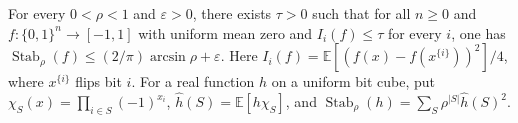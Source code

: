 \begin{theorem}
For every $0<\rho<1$ and $\varepsilon>0$, there exists $\tau>0$ such that for all $n\ge0$ and $f\colon\{0,1\}^n\to[-1,1]$ with uniform mean zero and $I_i(f)\le\tau$ for every $i$, one has $\operatorname{Stab}_\rho(f)\le(2/\pi)\arcsin\rho+\varepsilon$. Here $I_i(f)=\mathbb E[(f(x)-f(x^{\{i\}}))^2]/4$, where $x^{\{i\}}$ flips bit $i$. For a real function $h$ on a uniform bit cube, put $\chi_S(x)=\prod_{i\in S}(-1)^{x_i}$, $\widehat h(S)=\mathbb E[h\chi_S]$, and $\operatorname{Stab}_\rho(h)=\sum_S\rho^{|S|}\widehat h(S)^2$.
\end{theorem}
